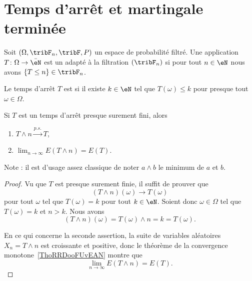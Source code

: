 \section{Temps d'arrêt et martingale terminée}

\begin{definition}
	Soit \( (\Omega,\tribF_n,\tribF,P)\) un espace de probabilité filtré. Une application \( T\colon \Omega\to \bar \eN\) est un  adapté à la filtration \( (\tribF_n)\) si pour tout \( n\in \eN\) nous avons \( \{ T\leq n \}\in\tribF_n\).

	Le temps d'arrêt \( T\) est  si il existe \( k\in \eN\) tel que \( T(\omega)\leq k\) pour presque tout \( \omega\in \Omega\).
\end{definition}

\begin{lemma} \label{LemXYeCLXW}
	Si \( T\) est un temps d'arrêt presque surement fini, alors
	\begin{enumerate}
		\item \( T\wedge n\stackrel{p.s.}{\longrightarrow}T\),
		\item   \label{ItemIPPkxmAii}
		      \( \lim_{n\to \infty}  E(T\wedge n)=E(T)\).
	\end{enumerate}
	Note : il est d'usage assez classique de noter \( a\wedge b\) le minimum de \( a\) et \( b\).
\end{lemma}

\begin{proof}
	Vu que \( T \) est presque surement finie, il suffit de prouver que
	\begin{equation}    \label{EqRVoKxsN}
		(T\wedge n)(\omega)\to T(\omega)
	\end{equation}
	pour tout \( \omega\) tel que \( T(\omega)=k\) pour tout \( k\in \eN\). Soient donc \( \omega\in \Omega\) tel que \( T(\omega)=k\) et \( n>k\). Nous avons
	\begin{equation}
		(T\wedge n)(\omega)=T(\omega)\wedge n=k=T(\omega).
	\end{equation}

	En ce qui concerne la seconde assertion, la suite de variables aléatoires \( X_n=T\wedge n\) est croissante et positive, donc le théorème de la convergence monotone~\ref{ThoRRDooFUvEAN} montre que
	\begin{equation}
		\lim_{n\to \infty}E(T\wedge n)=E(T).
	\end{equation}
\end{proof}

